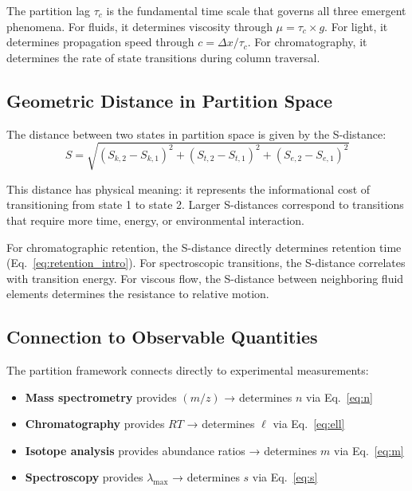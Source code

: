 \documentclass[twocolumn,superscriptaddress,prb,10pt]{revtex4-2}
\begin{document}
The partition lag $\tau_c$ is the fundamental time scale that governs all three emergent phenomena. For fluids, it determines viscosity through $\mu = \tau_c \times g$. For light, it determines propagation speed through $c = \Delta x / \tau_c$. For chromatography, it determines the rate of state transitions during column traversal.

\subsection{Geometric Distance in Partition Space}

The distance between two states in partition space is given by the S-distance:
\begin{equation}
S = \sqrt{(S_{k,2} - S_{k,1})^2 + (S_{t,2} - S_{t,1})^2 + (S_{e,2} - S_{e,1})^2}
\label{eq:sdistance}
\end{equation}

This distance has physical meaning: it represents the informational cost of transitioning from state 1 to state 2. Larger S-distances correspond to transitions that require more time, energy, or environmental interaction.

For chromatographic retention, the S-distance directly determines retention time (Eq.~\ref{eq:retention_intro}). For spectroscopic transitions, the S-distance correlates with transition energy. For viscous flow, the S-distance between neighboring fluid elements determines the resistance to relative motion.

\subsection{Connection to Observable Quantities}

The partition framework connects directly to experimental measurements:

\begin{itemize}
\item \textbf{Mass spectrometry} provides $(m/z)$ → determines $n$ via Eq.~\ref{eq:n}
\item \textbf{Chromatography} provides $RT$ → determines $\ell$ via Eq.~\ref{eq:ell}
\item \textbf{Isotope analysis} provides abundance ratios → determines $m$ via Eq.~\ref{eq:m}
\item \textbf{Spectroscopy} provides $\lambda_{\max}$ → determines $s$ via Eq.~\ref{eq:s}
\end{itemize}
\end{document}
